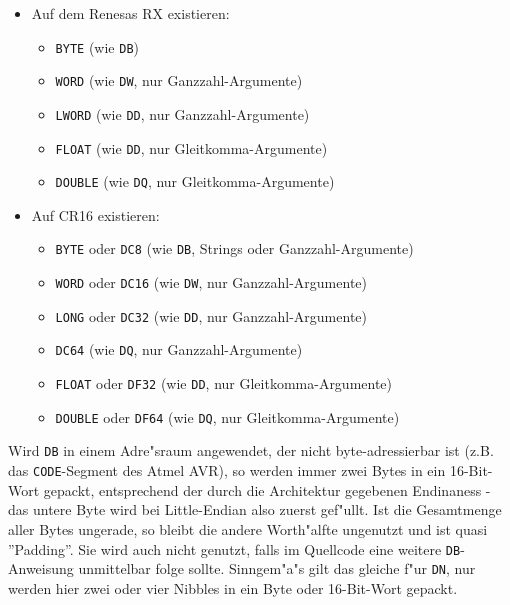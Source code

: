 \documentclass[12pt,a4paper,twoside]{report}
\makeatletter
\newcommand{\tty}[1]{{\tt #1}}
\newcommand{\ttindex}[1]{\index{#1@{\tt #1}}}
\makeatother
\begin{document}
\begin{itemize}
{\begin{itemize}
      \item{\tty{WORD} (wie \tty{DW}, nur Ganzzahl-Argumente)}
      \item{\tty{LONG} oder \tty{INT} (wie \tty{DD}, nur Ganzzahl-Argumente)}
      \item{\tty{FLOAT} (wie \tty{DD}, nur Gleitkomma-Argumente)}
      \item{\tty{DOUBLE} (wie \tty{DQ}, nur Gleitkomma-Argumente)}
      \end{itemize}}
\ttindex{LWORD}\ttindex{QUAD}
\item{Auf dem Renesas RX existieren:
      \begin{itemize}
      \item{\tty{BYTE} (wie \tty{DB})}
      \item{\tty{WORD} (wie \tty{DW}, nur Ganzzahl-Argumente)}
      \item{\tty{LWORD} (wie \tty{DD}, nur Ganzzahl-Argumente)}
      \item{\tty{FLOAT} (wie \tty{DD}, nur Gleitkomma-Argumente)}
      \item{\tty{DOUBLE} (wie \tty{DQ}, nur Gleitkomma-Argumente)}
      \end{itemize}}
\item{Auf CR16 existieren:
      \begin{itemize}
      \item{\tty{BYTE} oder \tty{DC8} (wie \tty{DB}, Strings oder Ganzzahl-Argumente)}
      \item{\tty{WORD} oder \tty{DC16} (wie \tty{DW}, nur Ganzzahl-Argumente)}
      \item{\tty{LONG} oder \tty{DC32} (wie \tty{DD}, nur Ganzzahl-Argumente)}
      \item{\tty{DC64} (wie \tty{DQ}, nur Ganzzahl-Argumente)}
      \item{\tty{FLOAT} oder \tty{DF32} (wie \tty{DD}, nur Gleitkomma-Argumente)}
      \item{\tty{DOUBLE} oder \tty{DF64} (wie \tty{DQ}, nur Gleitkomma-Argumente)}
      \end{itemize}}
\end{itemize}

Wird \tty{DB} in einem Adre"sraum angewendet, der nicht byte-adressierbar
ist (z.B. das \tty{CODE}-Segment des Atmel AVR), so werden immer zwei Bytes
in ein 16-Bit-Wort gepackt, entsprechend der durch die Architektur gegebenen
Endinaness - das untere Byte wird bei Little-Endian also zuerst gef"ullt.  Ist
die Gesamtmenge aller Bytes ungerade, so bleibt die andere Worth"alfte ungenutzt
und ist quasi ''Padding''.  Sie wird auch nicht genutzt, falls im Quellcode
eine weitere \tty{DB}-Anweisung unmittelbar folge sollte.  Sinngem"a"s gilt
das gleiche f"ur \tty{DN}, nur werden hier zwei oder vier Nibbles in ein Byte
oder 16-Bit-Wort gepackt.
\end{document}
